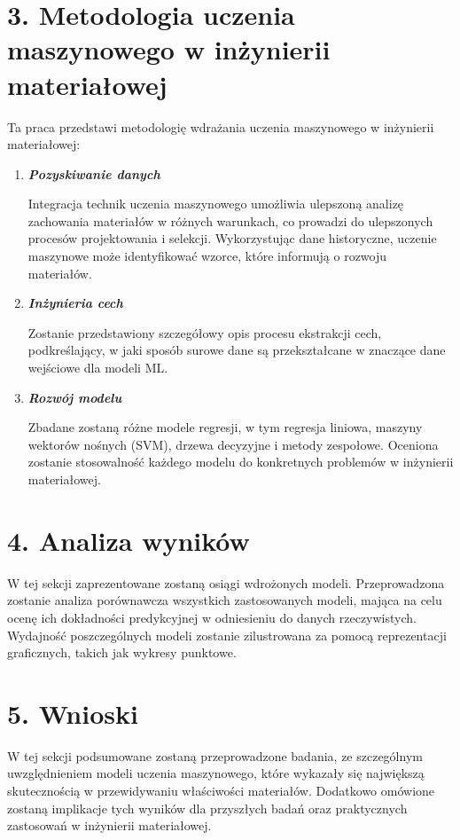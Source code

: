 {}
\section*{3. Metodologia uczenia maszynowego w inżynierii materiałowej}
\vspace{-1.0em}
Ta praca przedstawi metodologię wdrażania uczenia maszynowego w inżynierii materiałowej:


\begin{enumerate}
    \item \textbf{\textit{Pozyskiwanie danych}}


Integracja technik uczenia maszynowego umożliwia ulepszoną analizę zachowania materiałów w różnych warunkach, co prowadzi do ulepszonych procesów projektowania i selekcji.
Wykorzystując dane historyczne, uczenie maszynowe może identyfikować wzorce, które informują o rozwoju materiałów.

\item \textbf{\textit{Inżynieria cech}}


Zostanie przedstawiony szczegółowy opis procesu ekstrakcji cech, podkreślający, w jaki sposób surowe dane są przekształcane w znaczące dane wejściowe dla modeli ML.


\item \textbf{\textit{Rozwój modelu}}


Zbadane zostaną różne modele regresji, w tym regresja liniowa, maszyny wektorów nośnych (SVM), drzewa decyzyjne i metody zespołowe.
Oceniona zostanie stosowalność każdego modelu do konkretnych problemów w inżynierii materiałowej.
\end{enumerate}

{}

\section*{4. Analiza wyników}
\vspace{-1.0em}
W tej sekcji zaprezentowane zostaną osiągi wdrożonych modeli. Przeprowadzona zostanie analiza porównawcza wszystkich zastosowanych modeli, mająca na celu ocenę ich dokładności predykcyjnej w odniesieniu do danych rzeczywistych. Wydajność poszczególnych modeli zostanie zilustrowana za pomocą reprezentacji graficznych, takich jak wykresy punktowe.



{}
\section*{5. Wnioski}
\vspace{-1.0em}
W tej sekcji podsumowane zostaną przeprowadzone badania, ze szczególnym uwzględnieniem modeli uczenia maszynowego, które wykazały się największą skutecznością w przewidywaniu właściwości materiałów. Dodatkowo omówione zostaną implikacje tych wyników dla przyszłych badań oraz praktycznych zastosowań w inżynierii materiałowej.
\clearpage